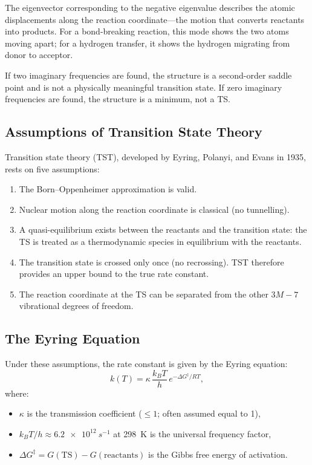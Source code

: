 \documentclass[11pt]{article}
\numberwithin{equation}{section}
\begin{document}
The eigenvector corresponding to the negative eigenvalue describes the atomic displacements along the reaction coordinate---the motion that converts reactants into products. For a bond-breaking reaction, this mode shows the two atoms moving apart; for a hydrogen transfer, it shows the hydrogen migrating from donor to acceptor.

If two imaginary frequencies are found, the structure is a second-order saddle point and is not a physically meaningful transition state. If zero imaginary frequencies are found, the structure is a minimum, not a TS.

\subsection{Assumptions of Transition State Theory}

Transition state theory (TST), developed by Eyring, Polanyi, and Evans in 1935, rests on five assumptions:

\begin{enumerate}
\item The Born--Oppenheimer approximation is valid.
\item Nuclear motion along the reaction coordinate is classical (no tunnelling).
\item A quasi-equilibrium exists between the reactants and the transition state: the TS is treated as a thermodynamic species in equilibrium with the reactants.
\item The transition state is crossed only once (no recrossing). TST therefore provides an upper bound to the true rate constant.
\item The reaction coordinate at the TS can be separated from the other $3M-7$ vibrational degrees of freedom.
\end{enumerate}

\subsection{The Eyring Equation}
\label{sec:eyring}

Under these assumptions, the rate constant is given by the Eyring equation:
\begin{equation}
\boxed{k(T) = \kappa\,\frac{k_BT}{h}\,e^{-\Delta G^\ddagger/RT},}
\label{eq:eyring}
\end{equation}
where:
\begin{itemize}
\item $\kappa$ is the transmission coefficient ($\leq 1$; often assumed equal to 1),
\item $k_BT/h \approx \SI{6.2e12}{s^{-1}}$ at \SI{298}{K} is the universal frequency factor,
\item $\Delta G^\ddagger = G(\text{TS}) - G(\text{reactants})$ is the Gibbs free energy of activation.
\end{itemize}
\end{document}
